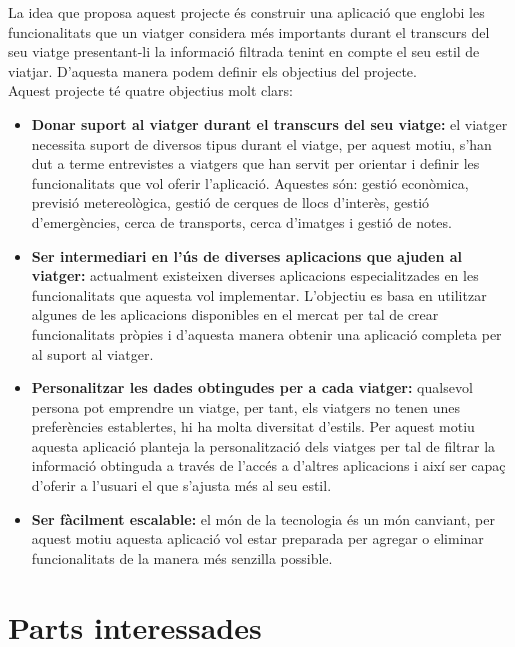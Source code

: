 La idea que proposa aquest projecte és construir una aplicació que englobi les funcionalitats que un viatger considera més importants durant el transcurs del seu viatge presentant-li la informació filtrada tenint en compte el seu estil de viatjar. D’aquesta manera podem definir els objectius del projecte.\\

Aquest projecte té quatre objectius molt clars:
\begin{itemize}
\item{\textbf{Donar suport al viatger durant el transcurs del seu viatge:}} el viatger necessita suport de diversos tipus durant el viatge, per aquest motiu, s’han dut a terme entrevistes a viatgers que han servit per orientar i definir les funcionalitats que vol oferir l’aplicació. Aquestes són: gestió econòmica, previsió metereològica, gestió de cerques de llocs d’interès, gestió d’emergències, cerca de transports, cerca d’imatges i gestió de notes.\\

\item{\textbf{Ser intermediari en l’ús de diverses aplicacions que ajuden al viatger:}} actualment existeixen diverses aplicacions especialitzades en les funcionalitats que aquesta vol implementar. L’objectiu es basa en utilitzar algunes de les aplicacions disponibles en el mercat per tal de crear funcionalitats pròpies i d’aquesta manera obtenir una aplicació completa per al suport al viatger. 

\item{\textbf{Personalitzar les dades obtingudes per a cada viatger:}} qualsevol persona pot emprendre un viatge, per tant, els viatgers no tenen unes preferències establertes, hi ha molta diversitat d’estils. Per aquest motiu aquesta aplicació planteja la personalització dels viatges per tal de filtrar la informació obtinguda a través de l’accés a d’altres aplicacions i així ser capaç d’oferir a l’usuari el que s’ajusta més al seu estil.

\item{\textbf{Ser fàcilment escalable:}} el món de la tecnologia és un món canviant, per aquest motiu aquesta aplicació vol estar preparada per agregar o eliminar funcionalitats de la manera més senzilla possible.

\end{itemize}

\section{Parts interessades}


